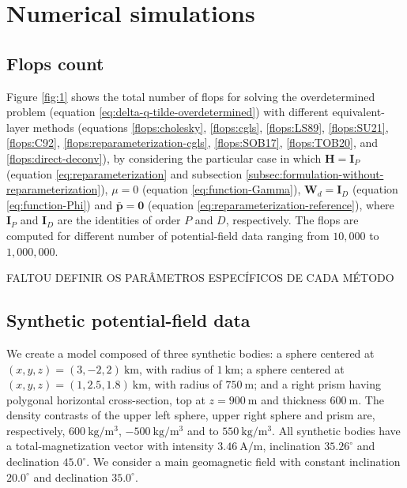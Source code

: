 \section{Numerical simulations}
\label{sec:numerical-simulations}

\subsection{Flops count}
\label{subsec:flops-count}

Figure \ref{fig:1} shows the total number of flops for solving the overdetermined problem
(equation \ref{eq:delta-q-tilde-overdetermined}) with different equivalent-layer methods
(equations \ref{flops:cholesky}, \ref{flops:cgls}, \ref{flops:LS89}, \ref{flops:SU21}, 
\ref{flops:C92}, \ref{flops:reparameterization-cgls}, \ref{flops:SOB17}, \ref{flops:TOB20},
and \ref{flops:direct-deconv}), by considering 
the particular case in which $\mathbf{H} = \mathbf{I}_{P}$ (equation \ref{eq:reparameterization} and 
subsection \ref{subsec:formulation-without-reparameterization}),
$\mu = 0$ (equation \ref{eq:function-Gamma}), 
$\mathbf{W}_{d} = \mathbf{I}_{D}$ (equation \ref{eq:function-Phi}) and
$\bar{\mathbf{p}} = \mathbf{0}$ (equation \ref{eq:reparameterization-reference}), 
where $\mathbf{I}_{P}$ and $\mathbf{I}_{D}$ are the identities of order $P$ and $D$, respectively.
The flops are computed for different number of potential-field data ranging from $10,000$ to $1,000,000$.

FALTOU DEFINIR OS PARÂMETROS ESPECÍFICOS DE CADA MÉTODO

\subsection{Synthetic potential-field data}
\label{subsec:synthetic-data}

We create a model composed of three synthetic bodies:
a sphere centered at $(x, y, z) = (3, -2, 2) \: \mathrm{km}$, with radius of $1 \: \mathrm{km}$;
a sphere centered at $(x, y, z) = (1, 2.5, 1.8) \: \mathrm{km}$, with radius of $750 \: \mathrm{m}$; and
a right prism having polygonal horizontal cross-section, top at $z = 900 \: \mathrm{m}$ and thickness $600 \: \mathrm{m}$.
The density contrasts of the upper left sphere, upper right sphere and prism are, respectively, 
$600 \: \mathrm{kg}/\mathrm{m}^{3}$, $-500 \: \mathrm{kg}/\mathrm{m}^{3}$ and to $550 \: \mathrm{kg}/\mathrm{m}^{3}$. 
All synthetic bodies have a total-magnetization vector with intensity $3.46 \: \mathrm{A}/\mathrm{m}$, inclination $35.26^{\circ}$
and declination $45.0^{\circ}$.
We consider a main geomagnetic field with constant inclination $20.0^{\circ}$ and declination $35.0^{\circ}$.

